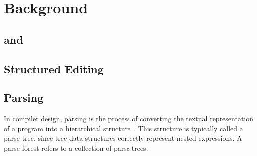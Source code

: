 \chapter{Background}


\section{\Beluga and \Harpoon}








\section{Structured Editing}


\section{Parsing}


In compiler design, parsing is the process of converting the textual representation of a program into a hierarchical structure~\cite{aho2007compilers, afroozeh2019practical}.
This structure is typically called a parse tree, since tree data structures correctly represent nested expressions.
A parse forest refers to a collection of parse trees.

